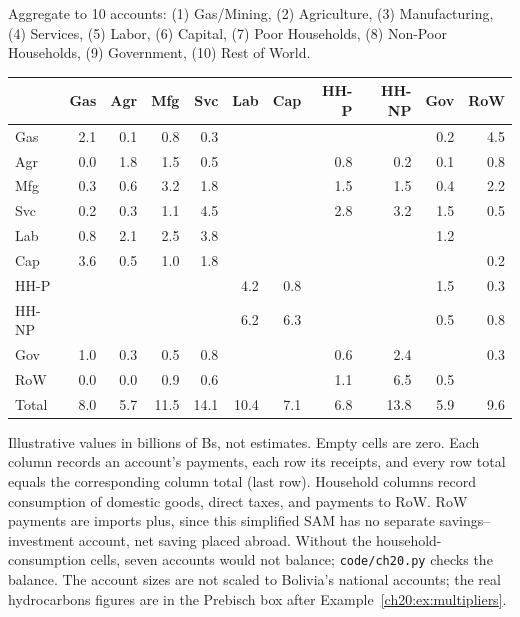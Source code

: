 \documentclass[../structural_economics_book.tex]{subfiles}
\begin{document}
\begin{example}\label{ch20:ex:bolivia_sam}
Aggregate to 10 accounts: (1) Gas/Mining, (2) Agriculture, (3) Manufacturing, (4) Services, (5) Labor, (6) Capital, (7) Poor Households, (8) Non-Poor Households, (9) Government, (10) Rest of World.

\begin{center}
\small
\begin{tabular}{l|rrrrrrrrrr}
\toprule
& Gas & Agr & Mfg & Svc & Lab & Cap & HH-P & HH-NP & Gov & RoW \\
\midrule
Gas & 2.1 & 0.1 & 0.8 & 0.3 & & & & & 0.2 & 4.5 \\
Agr & 0.0 & 1.8 & 1.5 & 0.5 & & & 0.8 & 0.2 & 0.1 & 0.8 \\
Mfg & 0.3 & 0.6 & 3.2 & 1.8 & & & 1.5 & 1.5 & 0.4 & 2.2 \\
Svc & 0.2 & 0.3 & 1.1 & 4.5 & & & 2.8 & 3.2 & 1.5 & 0.5 \\
Lab & 0.8 & 2.1 & 2.5 & 3.8 & & & & & 1.2 & \\
Cap & 3.6 & 0.5 & 1.0 & 1.8 & & & & & & 0.2 \\
HH-P & & & & & 4.2 & 0.8 & & & 1.5 & 0.3 \\
HH-NP & & & & & 6.2 & 6.3 & & & 0.5 & 0.8 \\
Gov & 1.0 & 0.3 & 0.5 & 0.8 & & & 0.6 & 2.4 & & 0.3 \\
RoW & 0.0 & 0.0 & 0.9 & 0.6 & & & 1.1 & 6.5 & 0.5 & \\
\midrule
Total & 8.0 & 5.7 & 11.5 & 14.1 & 10.4 & 7.1 & 6.8 & 13.8 & 5.9 & 9.6 \\
\bottomrule
\end{tabular}
\end{center}
\vspace{0.3em}
\small Illustrative values in billions of Bs, not estimates. Empty cells are zero. Each column records an account's payments, each row its receipts, and every row total equals the corresponding column total (last row). Household columns record consumption of domestic goods, direct taxes, and payments to RoW. RoW payments are imports plus, since this simplified SAM has no separate savings--investment account, net saving placed abroad. Without the household-consumption cells, seven accounts would not balance; \texttt{code/ch20.py} checks the balance. The account sizes are not scaled to Bolivia's national accounts; the real hydrocarbons figures are in the Prebisch box after Example~\ref{ch20:ex:multipliers}.
\end{example}
\end{document}
